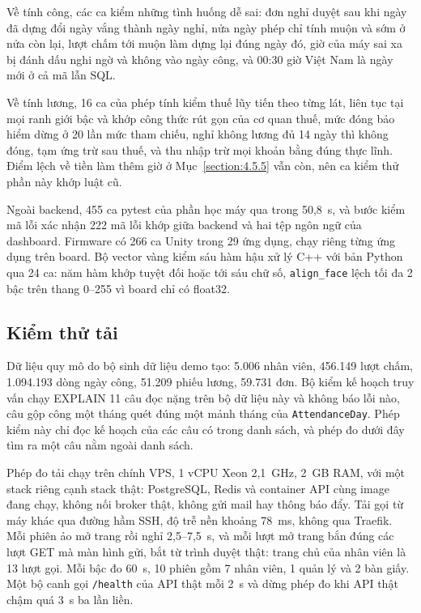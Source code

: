 \documentclass[../DoAn.tex]{subfiles}
\begin{document}
Về tính công, các ca kiểm những tình huống dễ sai: đơn nghỉ duyệt sau khi ngày đã dựng đổi ngày vắng thành ngày nghỉ, nửa ngày phép chỉ tính
muộn và sớm ở nửa còn lại, lượt chấm tới muộn làm dựng lại đúng ngày đó, giờ của máy sai xa bị đánh dấu nghi ngờ và không vào ngày công, và
00:30 giờ Việt Nam là ngày mới ở cả mã lẫn SQL.

Về tính lương, 16 ca của phép tính kiểm thuế lũy tiến theo từng lát, liên tục tại mọi ranh giới bậc và khớp công thức rút gọn của cơ quan
thuế, mức đóng bảo hiểm dừng ở 20 lần mức tham chiếu, nghỉ không lương đủ 14 ngày thì không đóng, tạm ứng trừ sau thuế, và thu nhập trừ mọi
khoản bằng đúng thực lĩnh. Điểm lệch về tiền làm thêm giờ ở Mục~\ref{section:4.5.5} vẫn còn, nên ca kiểm thử phần này khớp luật cũ.

Ngoài backend, 455 ca pytest của phần học máy qua trong 50,8~s, và bước kiểm mã lỗi xác nhận 222 mã lỗi khớp giữa backend và hai
tệp ngôn ngữ của dashboard. Firmware có 266 ca Unity trong 29 ứng dụng, chạy riêng từng ứng dụng trên board. Bộ vector vàng kiểm sáu hàm hậu xử lý
C++ với bản Python qua 24 ca: năm hàm khớp tuyệt đối hoặc tới sáu chữ số, \texttt{align\_face} lệch tối đa 2 bậc trên thang 0--255 vì board
chỉ có float32.

\subsection{Kiểm thử tải}
\label{section:5.6.2}

Dữ liệu quy mô do bộ sinh dữ liệu demo tạo: 5.006 nhân viên, 456.149 lượt chấm, 1.094.193 dòng ngày công, 51.209 phiếu lương, 59.731 đơn. Bộ kiểm kế hoạch truy vấn chạy
EXPLAIN 11 câu đọc nặng trên bộ dữ liệu này và không báo lỗi nào, câu gộp công một tháng quét đúng một mảnh tháng của \texttt{AttendanceDay}. Phép kiểm này chỉ đọc kế hoạch của
các câu có trong danh sách, và phép đo dưới đây tìm ra một câu nằm ngoài danh sách.

Phép đo tải chạy trên chính VPS, 1 vCPU Xeon 2,1~GHz, 2~GB RAM, với một stack riêng cạnh stack thật: PostgreSQL, Redis và container API cùng image đang chạy, không nối broker
thật, không gửi mail hay thông báo đẩy. Tải gọi từ máy khác qua đường hầm SSH, độ trễ nền khoảng 78~ms, không qua Traefik. Mỗi phiên ảo mở trang rồi nghỉ 2,5--7,5~s, và mỗi lượt
mở trang bắn đúng các lượt GET mà màn hình gửi, bắt từ trình duyệt thật: trang chủ của nhân viên là 13 lượt gọi. Mỗi bậc đo 60~s, 10 phiên gồm 7 nhân viên, 1 quản lý và 2 bàn
giấy. Một bộ canh gọi \texttt{/health} của API thật mỗi 2~s và dừng phép đo khi API thật chậm quá 3~s ba lần liền.
\end{document}
